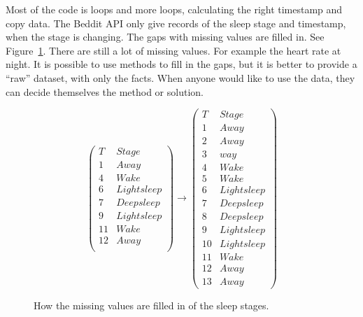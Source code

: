 
			Most of the code is loops and more loops, calculating the right timestamp and copy data. 
			The Beddit API only give records of the sleep stage and timestamp, when the stage is changing. The gaps with missing values are filled in. See Figure~\ref{fig:missingvalues}. There are still a lot of missing values. For example the heart rate at night. It is possible to use methods to fill in the gaps, but it is better to provide a ``raw'' dataset, with only the facts. When anyone would like to use the data, they can decide themselves the method or solution.
			\begin{figure}[h!]
			\[ 
				\left(
				\begin{array}{rc}
				T & Stage \\ \hline
				1 & Away \\
				4 & Wake \\
				6 & Light sleep \\
				7 & Deep sleep \\
				9 & Light sleep \\
				11 & Wake \\
				12 & Away \\
				\end{array}
				\right)
				\to
				\left(
				\begin{array}{rc}
				T & Stage \\ \hline
				1 & Away \\
				2 & Away \\
				3 & way \\
				4 & Wake \\
				5 & Wake \\
				6 & Light sleep \\
 				7 & Deep sleep \\
				8 & Deep sleep \\
				9 & Light sleep \\
				10 & Light sleep \\
				11 & Wake \\
				12 & Away \\
				13 & Away 
				\end{array}
				\right)
			\] 
			\caption{How the missing values are filled in of the sleep stages.}
			\label{fig:missingvalues}
		\end{figure}
		




